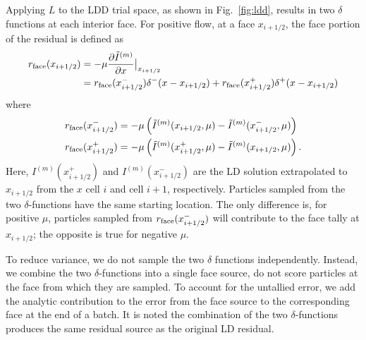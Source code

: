 Applying $L$ to the LDD trial space, as shown in Fig.~\ref{fig:ldd}, results in two $\delta$ functions at each interior face.
For positive flow, at a face $x_{i+1/2}$, the face portion of the residual is defined as
\begin{align}
    \label{eq:res_face}
    r_{\text{face}}(x_{i+1/2}) &= -\mu \frac{\partial \tilde I^{(m)}}{\partial x}\big|_{x_{i+1/2}}\\
    &= r_{\text{face}}(x_{i+1/2}^-)\delta^-(x - x_{i+1/2}) + r_{\text{face}}(x_{i+1/2}^+)\delta^+(x - x_{i+1/2}) 
\end{align}
where
\begin{align}
    r_{\text{face}}(x_{i+1/2}^-) &= -\mu\left( \tilde I^{(m)}(x_{i+1/2},\mu) - \tilde I^{(m)}(x_{i+1/2}^-,\mu)
           \right)\\
    r_{\text{face}}(x_{i+1/2}^+) &= -\mu\left( \tilde I^{(m)}(x_{i+1/2}^+,\mu) -
           \tilde I^{(m)}(x_{i+1/2},\mu)
           \right).
\end{align}
Here, $I^{(m)}(x_{i+1/2}^+)$ and $I^{(m)}(x_{i+1/2}^-)$ are the LD solution extrapolated to $x_{i+1/2}$ from the
$x$ cell $i$ and cell $i+1$, respectively.
Particles sampled from the two $\delta$-functions have the same starting location.  The
only difference is, for positive $\mu$,  particles sampled from $r_{\text{face}}(x^-_{i+1/2})$ will
contribute to the face tally at $x_{i+1/2}$; the opposite is true for negative $\mu$.

To reduce variance, we do not sample the two $\delta$ functions independently.
Instead, we combine the
two $\delta$-functions into a single face source,
do not score particles at the face from which they are sampled.  To account for the
untallied error, we add the analytic
contribution to the error from the face source to the corresponding face at the end of a batch.
It is noted the combination of the two $\delta$-functions produces the same residual source as the
original LD residual.

